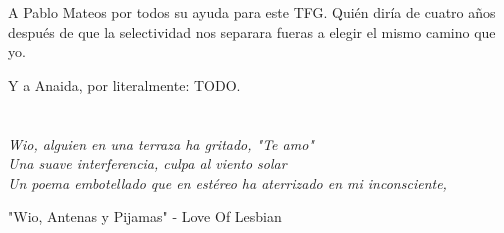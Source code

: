 \par A Pablo Mateos por todos su ayuda para este TFG. Quién diría de cuatro años después de que la selectividad nos separara fueras a elegir el mismo camino que yo.




\par Y a Anaida, por literalmente: TODO. 
\cleardoublepage %
\chapter*{}
\setlength{\leftmargin}{0.5\textwidth}
\setlength{\parsep}{0cm}
\addtolength{\topsep}{0.5cm}
\begin{flushright}
\small\em{
Wio, alguien en una terraza ha gritado, "Te amo"\\
Una suave interferencia, culpa al viento solar\\
Un poema embotellado que en estéreo ha aterrizado en mi inconsciente,\\}
\end{flushright}


\begin{flushright}
\small{
"Wio, Antenas y Pijamas" - Love Of Lesbian
}
\end{flushright}


\cleardoublepage %

